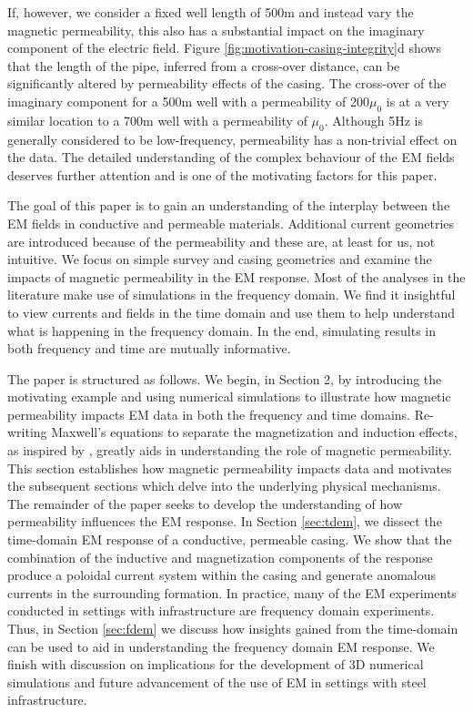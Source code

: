 \documentclass[onecolumn, extra, mreferee]{gji}
\begin{document}


If, however, we consider a fixed well length of 500m and instead vary the magnetic permeability, this also has a substantial impact on the imaginary component of the electric field. Figure \ref{fig:motivation-casing-integrity}d shows that the length of the pipe, inferred from a cross-over distance, can be significantly altered by permeability effects of the casing. The cross-over of the imaginary component for a 500m well with a permeability of 200$\mu_0$ is at a very similar location to a 700m well with a permeability of $\mu_0$. Although 5Hz is generally considered to be low-frequency, permeability has a non-trivial effect on the data. The detailed understanding of the complex behaviour of the EM fields deserves further attention and is one of the motivating factors for this paper.

The goal of this paper is to gain an understanding of the interplay between the EM fields in conductive and permeable materials. Additional current geometries are introduced because of the permeability and these are, at least for us, not intuitive. We focus on simple survey and casing geometries and examine the impacts of magnetic permeability in the EM response. Most of the analyses in the literature make use of simulations in the frequency domain. We find it insightful to view currents and fields in the time domain and use them to help understand what is happening in the frequency domain. In the end, simulating results in both frequency and time are mutually informative.

The paper is structured as follows. We begin, in Section 2,  by introducing the motivating example and using numerical simulations to illustrate how magnetic permeability impacts EM data in both the frequency and time domains. Re-writing Maxwell's equations to separate the magnetization and induction effects, as inspired by \cite{Pavlov2001, kaufman_principles_2009, Noh2016}, greatly aids in understanding the role of magnetic permeability. This section establishes how magnetic permeability impacts data and  motivates the subsequent sections which delve into the underlying physical mechanisms. The remainder of the paper seeks to develop the understanding of how permeability influences the EM response. In Section \ref{sec:tdem}, we dissect the time-domain EM response of a conductive, permeable casing. We show that the combination of the inductive and magnetization components of the response produce a poloidal current system within the casing and generate anomalous currents in the surrounding formation. In practice, many of the EM experiments conducted in settings with infrastructure are frequency domain experiments. Thus, in Section \ref{sec:fdem} we discuss how insights gained from the time-domain can be used to aid in understanding the frequency domain EM response. We finish with discussion on implications for the development of 3D numerical simulations and future advancement of the use of EM in settings with steel infrastructure.
\end{document}

